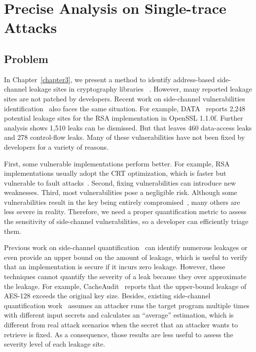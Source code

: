 
\chapter{Precise Analysis on Single-trace Attacks}\label{chapter4}

\section{Problem}
In Chapter~\ref{chapter3}, we present a method to identify address-based side-channel leakage sites in cryptography libraries ~\cite{Osvik2006,Gullasch:2011:CGB:2006077.2006784,203878,10.1007/978-3-540-45238-6_6}. However, many reported leakage sites are not patched by developers. Recent work on side-channel vulnerabilities identification~\cite{203878,217537,Wichelmann:2018:MFF:3274694.3274741,Brotzman19Casym,236338,182946} also faces the same situation. For example, DATA~\cite{217537} reports 2,248 potential leakage sites for the RSA implementation in OpenSSL 1.1.0f\@. Further analysis shows 1,510 leaks can be dismissed. But that leaves 460 data-access leaks and 278 control-flow leaks. Many of these vulnerabilities have not been fixed by developers for a variety of reasons.

First, some vulnerable implementations perform better. For example,
RSA implementations usually adopt the CRT optimization, which is faster but vulnerable to fault attacks~\cite{aumuller2002fault}. Second, fixing vulnerabilities can introduce new
weaknesses. Third, most vulnerabilities pose a negligible risk. Although some vulnerabilities result in the key being entirely compromised~\cite{184415, aumuller2002fault}, many others are less severe in reality. Therefore, we need a proper quantification metric to assess the sensitivity of side-channel vulnerabilities, so a developer can efficiently triage them.

Previous work on side-channel quantification~\cite{182946,5207642} can identify numerous leakages or even provide an upper bound on the amount of leakage, which is useful to verify that an implementation is secure if it incurs zero leakage.
However, these techniques cannot quantify the severity of a leak because they over approximate the leakage. For example, CacheAudit~\cite{182946}
reports that the upper-bound leakage of AES-128 exceeds the original key size. Besides, existing side-channel quantification work~\cite{182946,5207642} assumes an attacker runs the target program multiple times with different
input secrets and calculates an ``average'' estimation, which is different from real attack scenarios when the secret that an attacker wants to retrieve is fixed. As a consequence, those results are less useful to assess the severity level of each leakage site.

